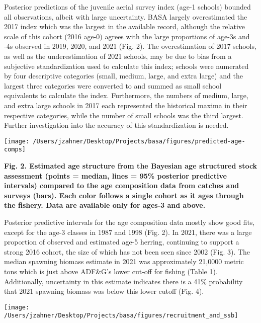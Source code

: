 \documentclass[
  11pt,
]{article}
\begin{document}
Posterior predictions of the juvenile aerial survey index (age-1
schools) bounded all observations, albeit with large uncertainty. BASA
largely overestimated the 2017 index which was the largest in the
available record, although the relative scale of this cohort (2016
age-0) agrees with the large proportions of age-3s and -4s observed in
2019, 2020, and 2021 (Fig. 2). The overestimation of 2017 schools, as
well as the underestimation of 2021 schools, may be due to bias from a
subjective standardization used to calculate this index; schools were
numerated by four descriptive categories (small, medium, large, and
extra large) and the largest three categories were converted to and
summed as small school equivalents to calculate the index. Furthermore,
the numbers of medium, large, and extra large schools in 2017 each
represented the historical maxima in their respective categories, while
the number of small schools was the third largest. Further investigation
into the accuracy of this standardization is needed.

\begin{center}\texttt{[image: /Users/jzahner/Desktop/Projects/basa/figures/predicted-age-comps]} \end{center}

\textbf{Fig. 2. Estimated age structure from the Bayesian age structured
stock assessment (points = median, lines = 95\% posterior predictive
intervals) compared to the age composition data from catches and surveys
(bars). Each color follows a single cohort as it ages through the
fishery. Data are available only for ages-3 and above.}

Posterior predictive intervals for the age composition data mostly show
good fits, except for the age-3 classes in 1987 and 1998 (Fig. 2). In
2021, there was a large proportion of observed and estimated age-5
herring, continuing to support a strong 2016 cohort, the size of which
has not been seen since 2002 (Fig. 3). The median spawning biomass
estimate in 2021 was approximately 21,0000 metric tons which is just
above ADF\&G's lower cut-off for fishing (Table 1). Additionally,
uncertainty in this estimate indicates there is a 41\% probability that
2021 spawning biomass was below this lower cutoff (Fig. 4).

\begin{center}\texttt{[image: /Users/jzahner/Desktop/Projects/basa/figures/recruitment\_and\_ssb]} \end{center}
\end{document}

